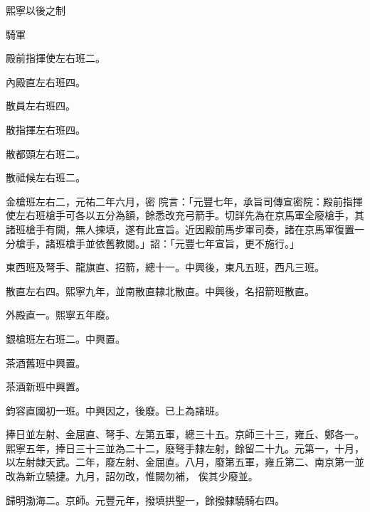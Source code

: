 
\begin{pinyinscope}

 熙寧以後之制



 騎軍



 殿前指揮使左右班二。



 內殿直左右班四。



 散員左右班四。



 散指揮左右班四。



 散都頭左右班二。



 散祗候左右班二。



 金槍班左右二，元祐二年六月，密
 院言：「元豐七年，承旨司傳宣密院：殿前指揮使左右班槍手可各以五分為額，餘悉改充弓箭手。切詳先為在京馬軍全廢槍手，其諸班槍手有闕，無人揀填，遂有此宣旨。近因殿前馬步軍司奏，諸在京馬軍復置一分槍手，諸班槍手並依舊教閱。」詔：「元豐七年宣旨，更不施行。」



 東西班及弩手、龍旗直、招箭，總十一。中興後，東凡五班，西凡三班。



 散直左右四。熙寧九年，並南散直隸北散直。中興後，名招箭班散直。



 外殿直一。熙寧五年廢。



 銀槍班左右班二。中興置。



 茶酒舊班中興置。



 茶酒新班中興置。



 鈞容直國初一班。中興因之，後廢。已上為諸班。



 捧日並左射、金屈直、弩手、左第五軍，總三十五。京師三十三，雍丘、鄭各一。熙寧五年，捧日三十三並為二十二，廢弩手隸左射，餘留二十九。元第一，十月，以左射隸天武。二年，廢左射、金屈直。八月，廢第五軍，雍丘第二、南京第一並改為新立驍捷。九月，詔勿改，惟闕勿補，
 俟其少廢並。



 歸明渤海二。京師。元豐元年，撥填拱聖一，餘撥隸驍騎右四。




\end{pinyinscope}
